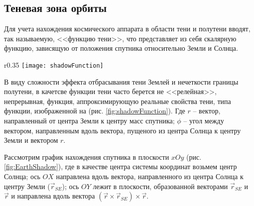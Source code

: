 \subsection{Теневая зона орбиты}
\noindent\indent Для учета нахождения космического аппарата в области тени и
полутени вводят, так называемую, <<функцию тени>>, что представляет из себя
скалярную функцию, зависящую от положения спутника относительно Земли и Солнца.
\begin{wrapfigure}{r}{0.35\textwidth}
  \centering
  \texttt{[image: shadowFunction]}
  \caption{Функция тени}
  \label{fig:shadowFunction}
\end{wrapfigure}
В виду сложности эффекта отбрасывания тени Землей и нечеткости границы полутени,
в качетсве функции тени часто берется не <<релейная>>, непрерывная, функция,
аппроксимирующую реальные свойства тени, типа функции, изображенной на
(рис. \ref{fig:shadowFunction}).
Где $r$ -- вектор, направленный от центра Земли к центру масс спутника; $\phi$
-- угол между вектором, направленным вдоль вектора, пущеного из центра Солнца к
центру Земли и вектором $r$.\par
Рассмотрим график нахождения спутника в плоскости $xOy$ (рис. \ref{fig:EarthShadow}),
где в качестве центра системы координат возьмем центр Солнца; ось $OX$ направлена
вдоль вектора, направленного из центра Солнца к центру Земли ($\vec{r}_{SE}$);
ось $OY$ лежит в плоскости, образованной векторами $\vec{r}_{SE}$ и $\vec{r}$ и направлена
вдоль вектора $(\vec{r}\times\vec{r}_{SE})\times\vec{r}$.
